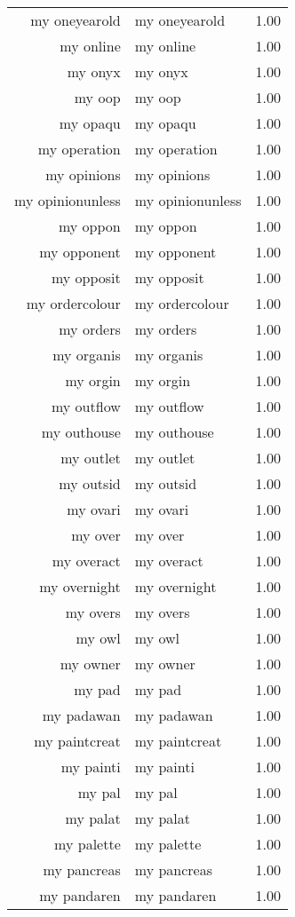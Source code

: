 \begin{table}[ht]
\begin{tabular}{rlr}
  my oneyearold & my oneyearold & 1.00 \\ 
  my online & my online & 1.00 \\ 
  my onyx & my onyx & 1.00 \\ 
  my oop & my oop & 1.00 \\ 
  my opaqu & my opaqu & 1.00 \\ 
  my operation & my operation & 1.00 \\ 
  my opinions & my opinions & 1.00 \\ 
  my opinionunless & my opinionunless & 1.00 \\ 
  my oppon & my oppon & 1.00 \\ 
  my opponent & my opponent & 1.00 \\ 
  my opposit & my opposit & 1.00 \\ 
  my ordercolour & my ordercolour & 1.00 \\ 
  my orders & my orders & 1.00 \\ 
  my organis & my organis & 1.00 \\ 
  my orgin & my orgin & 1.00 \\ 
  my outflow & my outflow & 1.00 \\ 
  my outhouse & my outhouse & 1.00 \\ 
  my outlet & my outlet & 1.00 \\ 
  my outsid & my outsid & 1.00 \\ 
  my ovari & my ovari & 1.00 \\ 
  my over & my over & 1.00 \\ 
  my overact & my overact & 1.00 \\ 
  my overnight & my overnight & 1.00 \\ 
  my overs & my overs & 1.00 \\ 
  my owl & my owl & 1.00 \\ 
  my owner & my owner & 1.00 \\ 
  my pad & my pad & 1.00 \\ 
  my padawan & my padawan & 1.00 \\ 
  my paintcreat & my paintcreat & 1.00 \\ 
  my painti & my painti & 1.00 \\ 
  my pal & my pal & 1.00 \\ 
  my palat & my palat & 1.00 \\ 
  my palette & my palette & 1.00 \\ 
  my pancreas & my pancreas & 1.00 \\ 
  my pandaren & my pandaren & 1.00 \\ 

\end{tabular}
\end{table}
